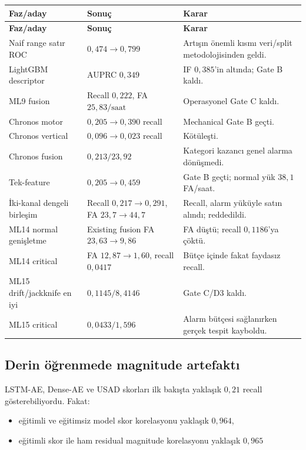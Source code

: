 \documentclass[11pt,a4paper,oneside]{report}
\newcommand{\code}[1]{\texttt{\detokenize{#1}}}
\begin{document}
\begin{longtable}{L{0.37\textwidth}L{0.23\textwidth}L{0.31\textwidth}}
\toprule
\textbf{Faz/aday} & \textbf{Sonuç} & \textbf{Karar}\\
\midrule
\endfirsthead
\toprule
\textbf{Faz/aday} & \textbf{Sonuç} & \textbf{Karar}\\
\midrule
\endhead
Naif range satır ROC & \(0{,}474\to0{,}799\) & Artışın önemli kısmı veri/split metodolojisinden geldi.\\
LightGBM descriptor & AUPRC \(0{,}349\) & IF \(0{,}385\)'in altında; Gate B kaldı.\\
ML9 fusion & Recall \(0{,}222\), FA \(25{,}83/\text{saat}\) & Operasyonel Gate C kaldı.\\
Chronos motor & \(0{,}205\to0{,}390\) recall & Mechanical Gate B geçti.\\
Chronos vertical & \(0{,}096\to0{,}023\) recall & Kötüleşti.\\
Chronos fusion & \(0{,}213/23{,}92\) & Kategori kazancı genel alarma dönüşmedi.\\
Tek-feature \code{actuator_thrust_cmd} & \(0{,}205\to0{,}459\) & Gate B geçti; normal yük \(38{,}1\) FA/saat.\\
İki-kanal dengeli birleşim & Recall \(0{,}217\to0{,}291\), FA \(23{,}7\to44{,}7\) & Recall, alarm yüküyle satın alındı; reddedildi.\\
ML14 normal genişletme & Existing fusion FA \(23{,}63\to9{,}86\) & FA düştü; recall \(0{,}1186\)'ya çöktü.\\
ML14 critical & FA \(12{,}87\to1{,}60\), recall \(0{,}0417\) & Bütçe içinde fakat faydasız recall.\\
ML15 drift/jackknife en iyi & \(0{,}1145/8{,}4146\) & Gate C/D3 kaldı.\\
ML15 critical & \(0{,}0433/1{,}596\) & Alarm bütçesi sağlanırken gerçek tespit kayboldu.\\
\bottomrule
\end{longtable}

\subsection{Derin öğrenmede magnitude artefaktı}

LSTM-AE, Dense-AE ve USAD skorları ilk bakışta yaklaşık \(0{,}21\) recall
gösterebiliyordu. Fakat:

\begin{itemize}
  \item eğitimli ve eğitimsiz model skor korelasyonu yaklaşık \(0{,}964\),
  \item eğitimli skor ile ham residual magnitude korelasyonu yaklaşık \(0{,}965\)
\end{itemize}
\end{document}

